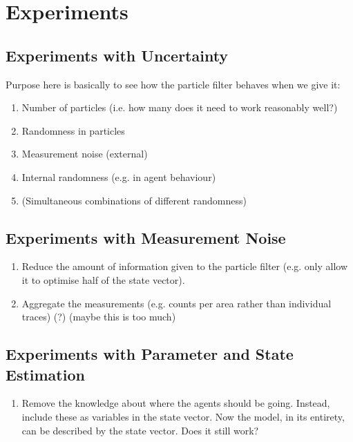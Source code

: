 \section{Experiments\label{experiments}}

\subsection{Experiments with Uncertainty}

Purpose here is basically to see how the particle filter behaves when we give it:

\begin{enumerate}
\item Number of particles (i.e. how many does it need to work reasonably well?)
\item Randomness in particles
\item Measurement noise (external)
\item Internal randomness (e.g. in agent behaviour)
\item (Simultaneous combinations of different randomness)
\end{enumerate}

\subsection{Experiments with Measurement Noise}

\begin{enumerate}
\item Reduce the amount of information given to the particle filter (e.g. only allow it to optimise half of the state vector).
\item Aggregate the measurements (e.g. counts per area rather than individual traces) (?) (maybe this is too much)
\end{enumerate}

\subsection{Experiments with Parameter and State Estimation}

\begin{enumerate}
\item Remove the knowledge about where the agents should be going. Instead, include these as variables in the state vector. Now the model, in its entirety, can be described by the state vector. Does it still work?
\end{enumerate}


